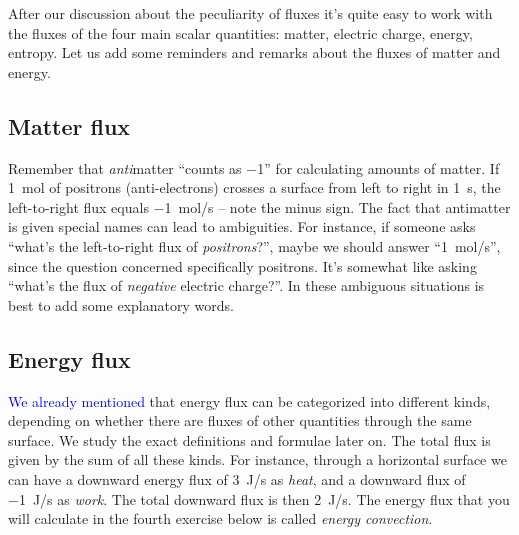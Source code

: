\documentclass[a4paper,12pt,%
onecolumn,oneside,titlepage,%
british%
]{memoir}
\renewcommand*{\|}[1][]{\nonscript\:#1\vert\nonscript\:\mathopen{}}
\newcommand*{\sect}{\S}%
\renewcommand*{\autoref}[2]{\sidepar{\vspace{-1ex}\footnotesize{\color{blue}\faIcon{hand-point-right}\enspace\sect\,\ref{#1} p.\,\pageref{#1}}}\textcolor{blue}{#2}}
\begin{document}
\bigskip

After our discussion about the peculiarity of fluxes it's quite easy to work with the fluxes of the four main scalar quantities: matter, electric charge, energy, entropy. Let us add some reminders and remarks about the fluxes of matter and energy.


\subsection{Matter flux}
\label{sec:matter_flux}

Remember that \emph{anti}matter \enquote{counts as \num{-1}} for calculating amounts of matter. If \qty{1}{mol} of positrons (anti-electrons) crosses a surface from left to right in \qty{1}{s}, the left-to-right flux equals \qty{-1}{mol/s} -- note the minus sign. The fact that antimatter is given special names can lead to ambiguities. For instance, if someone asks \enquote{what's the left-to-right flux of \emph{positrons}?}, maybe we should answer \enquote{\qty{1}{mol/s}}, since the question concerned specifically positrons. It's somewhat like asking \enquote{what's the flux of \emph{negative} electric charge?}. In these ambiguous situations is best to add some explanatory words.

\subsection{Energy flux}
\label{sec:energy_flux}
\autoref{sec:forms_energy}{We already mentioned} that energy flux can be categorized into different kinds, depending on whether there are fluxes of other quantities through the same surface. We study the exact definitions and formulae later on. The total flux is given by the sum of all these kinds. For instance, through a horizontal surface we can have a downward energy flux of \qty{3}{J/s} as \emph{heat}, and a downward flux of \qty{-1}{J/s} as \emph{work}. The total downward flux is then \qty{2}{J/s}. The energy flux that you will calculate in the fourth exercise below is called \emph{energy convection}.

\bigskip
\end{document}
